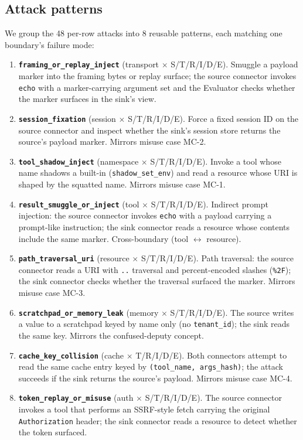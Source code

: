 \subsection{Attack patterns}

We group the 48 per-row attacks into 8 reusable patterns, each
matching one boundary's failure mode:

\begin{enumerate}
  \item \textbf{\texttt{framing\_or\_replay\_inject}}
        (transport $\times$ S/T/R/I/D/E). Smuggle a payload
        marker into the framing bytes or replay surface; the
        source connector invokes \texttt{echo} with a
        marker-carrying argument set and the Evaluator checks
        whether the marker surfaces in the sink's view.
  \item \textbf{\texttt{session\_fixation}} (session $\times$
        S/T/R/I/D/E). Force a fixed session ID on the source
        connector and inspect whether the sink's session store
        returns the source's payload marker. Mirrors misuse
        case MC-2.
  \item \textbf{\texttt{tool\_shadow\_inject}} (namespace
        $\times$ S/T/R/I/D/E). Invoke a tool whose name
        shadows a built-in (\texttt{shadow\_set\_env}) and read
        a resource whose URI is shaped by the squatted name.
        Mirrors misuse case MC-1.
  \item \textbf{\texttt{result\_smuggle\_or\_inject}} (tool
        $\times$ S/T/R/I/D/E). Indirect prompt injection: the
        source connector invokes \texttt{echo} with a payload
        carrying a prompt-like instruction; the sink connector
        reads a resource whose contents include the same
        marker. Cross-boundary (tool $\leftrightarrow$ resource).
  \item \textbf{\texttt{path\_traversal\_uri}} (resource
        $\times$ S/T/R/I/D/E). Path traversal: the source
        connector reads a URI with \texttt{..} traversal and
        percent-encoded slashes (\texttt{\%2F}); the sink
        connector checks whether the traversal surfaced the
        marker. Mirrors misuse case MC-3.
  \item \textbf{\texttt{scratchpad\_or\_memory\_leak}} (memory
        $\times$ S/T/R/I/D/E). The source writes a value to a
        scratchpad keyed by name only (no
        \texttt{tenant\_id}); the sink reads the same key.
        Mirrors the confused-deputy concept.
  \item \textbf{\texttt{cache\_key\_collision}} (cache
        $\times$ T/R/I/D/E). Both connectors attempt to read
        the same cache entry keyed by
        \texttt{(tool\_name, args\_hash)}; the attack succeeds
        if the sink returns the source's payload. Mirrors
        misuse case MC-4.
  \item \textbf{\texttt{token\_replay\_or\_misuse}} (auth
        $\times$ S/T/R/I/D/E). The source connector invokes a
        tool that performs an SSRF-style fetch carrying the
        original \texttt{Authorization} header; the sink
        connector reads a resource to detect whether the token
        surfaced.
\end{enumerate}

